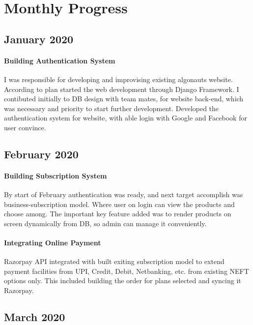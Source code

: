 \chapter{Monthly Progress}
\section{January 2020}
\subsubsection{Building Authentication System}
I was responsible for developing and improvising existing algonauts website. According to plan started the web development through Django Framework. I contibuted initially to DB design with team mates, for website back-end, which was necessary and priority to start further development. Developed the authentication system for website, with able login with Google and Facebook for user convince.

\section{February 2020}
\subsubsection{Building Subscription System}
By start of February authentication was ready, and next target accomplish was business-subscription model. Where user on login can view the products and choose among. The important key feature added was to render products on screen dynamically from DB, so admin can manage it conveniently.
\subsubsection{Integrating Online Payment}
Razorpay API integrated with built exiting subscription model to extend payment facilities from UPI, Credit, Debit, Netbanking, etc. from existing NEFT options only. This included building the order for plans selected and syncing it Razorpay.

\section{March 2020}
